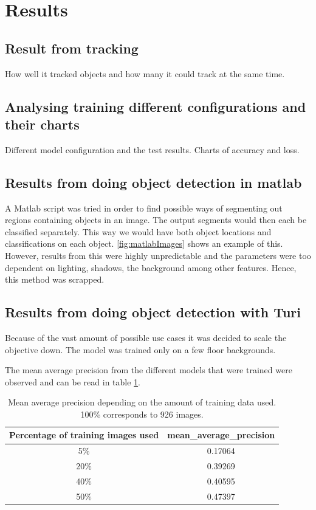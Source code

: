 \section{Results}
\subsection{Result from tracking}

How well it tracked objects and how many it could track at the same time.

\subsection{Analysing training different configurations and their charts}

Different model configuration and the test results. Charts of accuracy and loss.

\subsection{Results from doing object detection in matlab}
A Matlab script was tried in order to find possible ways of segmenting out regions containing objects in an image. The output segments would then each be classified separately. This way we would have both object locations and classifications on each object. \ref{fig:matlabImages} shows an example of this. However, results from this were highly unpredictable and the parameters were too dependent on lighting, shadows, the background among other features. Hence, this method was scrapped.

\subsection{Results from doing object detection with Turi}
Because of the vast amount of possible use cases it was decided to scale the objective down. The model was trained only on a few floor backgrounds. 

The mean average precision from the different models that were trained were observed and can be read in table \ref{table:mAP}. 

\begin{table}[h]
\centering
\begin{tabular}{ |c|c| } 
 \hline
 Percentage of training images used & mean\_average\_precision  \\ 
 \hline
 5\% & 0.17064 \\ 
 \hline
 20\% & 0.39269 \\ 
 \hline
 40\% & 0.40595 \\
 \hline
 50\% & 0.47397
 \hline
\end{tabular}
\caption{Mean average precision depending on the amount of training data used. 100\% corresponds to 926 images.}
\label{table:mAP}
\end{table}

